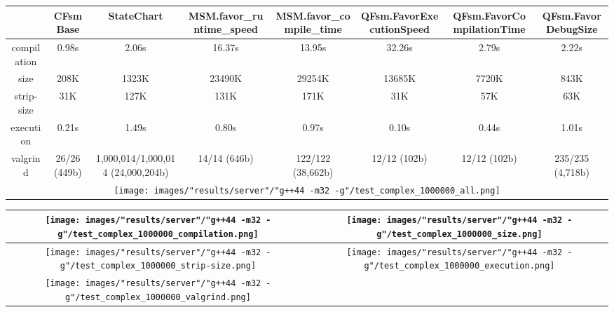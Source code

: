 \begin{landscape}
\begin{table}
\caption{"server" [54c084f], g++44 -m32 -g/test complex 1000000}
\centering
\begin{longtable}{| c | c |c |c |c |c |c |c |}
\hline
& CFsmBase& StateChart& MSM.favor\_runtime\_speed& MSM.favor\_compile\_time& QFsm.FavorExecutionSpeed& QFsm.FavorCompilationTime& QFsm.FavorDebugSize\\
\hline
compilation & 0.98s & 2.06s & 16.37s & 13.95s & 32.26s & 2.79s & 2.22s\\
\hline
size & 208K & 1323K & 23490K & 29254K & 13685K & 7720K & 843K\\
\hline
strip-size & 31K & 127K & 131K & 171K & 31K & 57K & 63K\\
\hline
execution & 0.21s & 1.49s & 0.80s & 0.97s & 0.10s & 0.44s & 1.01s\\
\hline
valgrind & 26/26 (449b) & 1,000,014/1,000,014 (24,000,204b) & 14/14 (646b) & 122/122 (38,662b) & 12/12 (102b) & 12/12 (102b) & 235/235 (4,718b)\\
\hline
\multicolumn{8}{|c|}{\texttt{[image: images/"results/server"/"g++44 -m32 -g"/test\_complex\_1000000\_all.png]}}\\
\hline
\end{longtable}
\end{table}
\end{landscape}
\newpage
\begin{table}
\centering
\begin{longtable}{| c | c |}
\hline
\texttt{[image: images/"results/server"/"g++44 -m32 -g"/test\_complex\_1000000\_compilation.png]}& \texttt{[image: images/"results/server"/"g++44 -m32 -g"/test\_complex\_1000000\_size.png]}\\
\hline
\texttt{[image: images/"results/server"/"g++44 -m32 -g"/test\_complex\_1000000\_strip-size.png]}& \texttt{[image: images/"results/server"/"g++44 -m32 -g"/test\_complex\_1000000\_execution.png]}\\
\hline
\texttt{[image: images/"results/server"/"g++44 -m32 -g"/test\_complex\_1000000\_valgrind.png]}& \\ \hline
\end{longtable}
\end{table}
